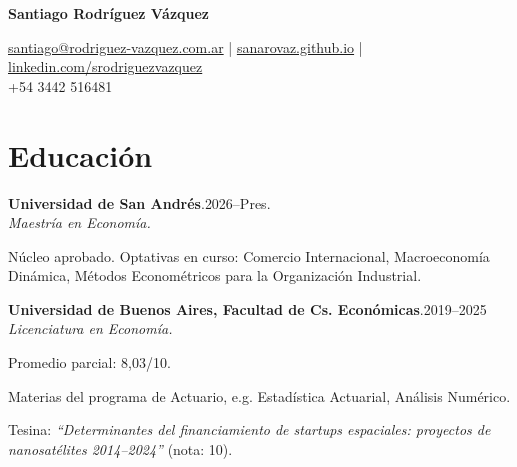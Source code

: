 \documentclass[11pt]{article}
\newcommand{\cvname}{Santiago Rodríguez Vázquez}
\newcommand{\entrydate}[1]{\hfill{\small{#1}}}
\begin{document}
\thispagestyle{firstpage}

{\LARGE\bfseries {\cvname}}

\href{mailto:santiago@rodriguez-vazquez.com.ar}{santiago@rodriguez-vazquez.com.ar} | \href{https://sanarovaz.github.io}{sanarovaz.github.io} | \href{https://linkedin.com/srodriguezvazquez}{linkedin.com/srodriguezvazquez}
\\
+54 3442 516481


\section{Educación}
\textbf{Universidad de San Andrés}.\entrydate{2026--Pres.}\\
\textit{Maestría en Economía.}
\begin{cvitems}
  \item Núcleo aprobado. Optativas en curso: Comercio Internacional, Macroeconomía Dinámica,
        Métodos Econométricos para la Organización Industrial.
\end{cvitems}

\smallskip
\textbf{Universidad de Buenos Aires, Facultad de Cs. Económicas}.\entrydate{2019--2025}\\
\textit{Licenciatura en Economía.}
\begin{cvitems}
  \item Promedio parcial: 8,03/10.
  \item Materias del programa de Actuario, e.g. Estadística Actuarial, Análisis Numérico.
  \item Tesina: \emph{``Determinantes del financiamiento de startups espaciales: proyectos de nanosatélites 2014--2024''} (nota: 10).
\end{cvitems}

\end{document}
